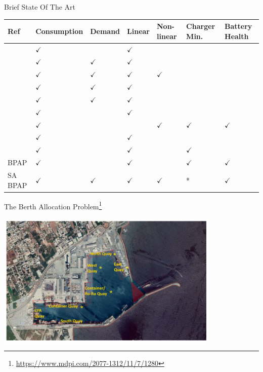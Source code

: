 \documentclass[aspectratio=169,dvipsnames]{beamer}
\begin{document}
\begin{frame}[label={sec:org57dc11b}]{Brief State Of The Art}
{\scriptsize
\begin{center}
\begin{tabularx}{\textwidth}{XXXXXXX}
\hline
Ref & Consumption & Demand & Linear & Non-linear & Charger Min. & Battery Health\\[0pt]
\hline
\cite{duan-2021-refor-mixed} & \(\checkmark\) &  & \(\checkmark\) &  &  & \\[0pt]
\cite{frendo-2021-open-sourc} & \(\checkmark\) & \(\checkmark\) & \(\checkmark\) &  &  & \\[0pt]
\cite{jahic-2019-preem} & \(\checkmark\) & \(\checkmark\) & \(\checkmark\) & \(\checkmark\) &  & \\[0pt]
\cite{mortensen-2023-cost-minim} & \(\checkmark\) & \(\checkmark\) & \(\checkmark\) &  &  & \\[0pt]
\cite{qin-2016-numer-analy} & \(\checkmark\) & \(\checkmark\) & \(\checkmark\) &  &  & \\[0pt]
\cite{rinaldi-2020-mixed-fleet} & \(\checkmark\) &  & \(\checkmark\) &  &  & \\[0pt]
\cite{whitaker-2023-a-network} & \(\checkmark\) &  &  & \(\checkmark\) & \(\checkmark\) & \(\checkmark\)\\[0pt]
\cite{zhou-2020-collab-optim} & \(\checkmark\) &  & \(\checkmark\) &  &  & \\[0pt]
\cite{zhou-2020-bi-objec} & \(\checkmark\) &  & \(\checkmark\) &  & \(\checkmark\) & \\[0pt]
BPAP & \(\checkmark\) &  & \(\checkmark\) &  & \(\checkmark\) & \(\checkmark\)\\[0pt]
SA BPAP & \(\checkmark\) & \(\checkmark\) & \(\checkmark\) & \(\checkmark\) & * & \(\checkmark\)\\[0pt]
\hline
\end{tabularx}
\end{center}
}
\end{frame}

\begin{frame}[label={sec:org8826a09}]{The Berth Allocation Problem\footnote{\url{https://www.mdpi.com/2077-1312/11/7/1280}}}
\begin{center}
\includegraphics[width=0.8\textwidth]{./img/berthing-sky-picture.png}
\end{center}
\end{frame}
\end{document}
